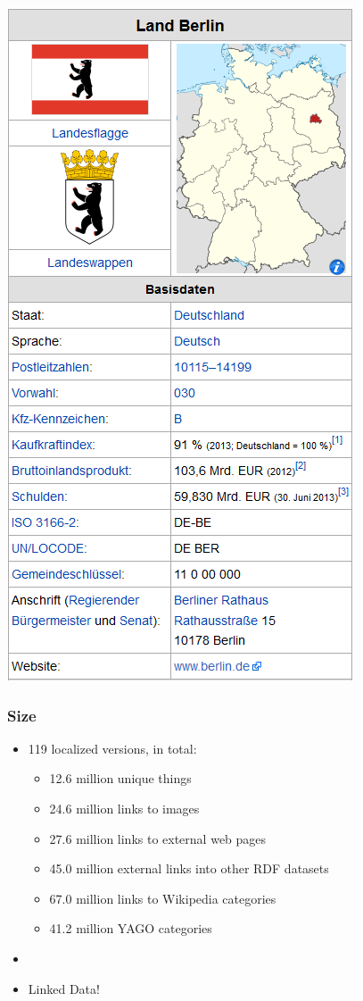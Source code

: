 \begin{frame}
\begin{minipage}{0.25\textwidth}
\includegraphics[scale=0.25]{img/berlin.png}
\end{minipage}
\end{frame}

\begin{frame}
\frametitle{Size}
\begin{itemize}
  \item 119 localized versions, in total:
  \begin{itemize}
    \item  12.6 million unique things
    \item 24.6 million links to images
    \item 27.6 million links to external web
    pages
    \item 45.0 million external links into other RDF datasets
    \item 67.0 million links to Wikipedia categories
    \item 41.2 million YAGO categories
  \end{itemize}
  \item[]
  \item Linked Data!
\end{itemize}
\end{frame}

